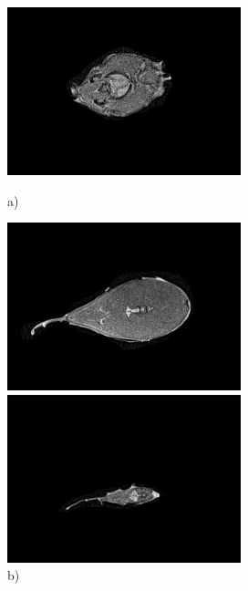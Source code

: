 \begin{figure}
    \centering
    \begin{minipage}[t]{0.32\textwidth}
    \includegraphics[width=\textwidth]{figures/cs12.png}
    \caption*{a)}
    \end{minipage}
    \begin{minipage}[t]{0.32\textwidth}
    \includegraphics[width=\textwidth]{figures/cs62.png}
    \caption*{b)}
    \end{minipage}
    \begin{minipage}[t]{0.32\textwidth}
    \includegraphics[width=\textwidth]{figures/cs114.png}

\end{minipage}
\end{figure}
